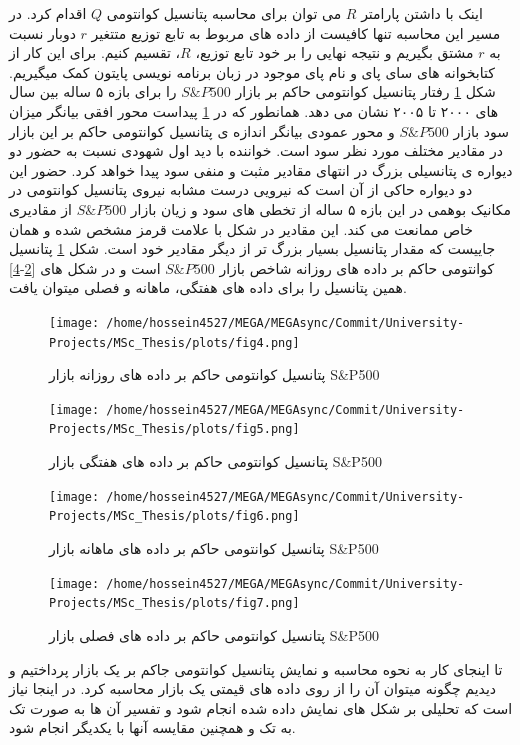 \documentclass[a4paper,titlepage,12pt,fleqn,oneside]{report}
\begin{document}
\newpage
اینک با داشتن پارامتر $R$ می توان برای محاسبه پتانسیل کوانتومی $Q$ اقدام کرد.  در مسیر این محاسبه تنها کافیست از داده های مربوط به تابع توزیع متتغیر $r$ دوبار نسبت به $r$ مشتق بگیریم و نتیجه نهایی را بر خود تابع توزیع، $R$، تقسیم کنیم. برای این کار از کتابخوانه های سای پای و نام پای موجود در زبان برنامه نویسی پایتون کمک میگیریم. شکل
\ref{fig:4}
رفتار پتانسیل کوانتومی حاکم بر بازار 
$S\&P500$
را برای بازه ۵ ساله بین سال های ۲۰۰۰ تا ۲۰۰۵ نشان می دهد. همانطور که در 
\ref{fig:4}
پیداست محور افقی بیانگر میزان سود بازار
$S\&P500$
و محور عمودی بیانگر اندازه ی پتانسیل کوانتومی حاکم بر این بازار در مقادیر مختلف مورد نظر سود است. خواننده با دید اول شهودی نسبت به حضور دو دیواره ی پتانسیلی بزرگ در انتهای مقادیر مثبت و منفی سود پیدا خواهد کرد. حضور این دو دیواره حاکی از آن است که نیرویی درست مشابه نیروی پتانسیل کوانتومی در مکانیک بوهمی در این بازه ۵ ساله از تخطی های سود و زیان بازار 
$S\&P500$
از مقادیری خاص ممانعت می کند. این مقادیر در شکل با علامت قرمز مشخص شده و همان جاییست که مقدار پتانسیل بسیار بزرگ تر از دیگر مقادیر خود است. شکل 
\ref{fig:4}
پتانسیل کوانتومی حاکم بر داده های روزانه شاخص بازار 
$S\&P500$
است و در شکل های 
[\ref{fig:5}-\ref{fig:7}]
همین پتانسیل را برای داده های هفتگی، ماهانه و فصلی میتوان یافت.

\begin{figure}[ptb]
	\centering
	\texttt{[image: /home/hossein4527/MEGA/MEGAsync/Commit/University-Projects/MSc\_Thesis/plots/fig4.png]}
	\caption{پتانسیل کوانتومی حاکم بر داده های روزانه بازار S\&P500}
	\label{fig:4}
\end{figure}

\begin{figure}[ptb]
	\centering
	\texttt{[image: /home/hossein4527/MEGA/MEGAsync/Commit/University-Projects/MSc\_Thesis/plots/fig5.png]}
	\caption{پتانسیل کوانتومی حاکم بر داده های هفتگی بازار S\&P500}
	\label{fig:5}
\end{figure}

\begin{figure}[ptb]
	\centering
	\texttt{[image: /home/hossein4527/MEGA/MEGAsync/Commit/University-Projects/MSc\_Thesis/plots/fig6.png]}
	\caption{پتانسیل کوانتومی حاکم بر داده های ماهانه بازار S\&P500}
	\label{fig:6}
\end{figure}

\begin{figure}[ptb]
	\centering
	\texttt{[image: /home/hossein4527/MEGA/MEGAsync/Commit/University-Projects/MSc\_Thesis/plots/fig7.png]}
	\caption{پتانسیل کوانتومی حاکم بر داده های فصلی بازار S\&P500}
	\label{fig:7}
\end{figure}
\newpage
تا اینجای کار به نحوه محاسبه و نمایش پتانسیل کوانتومی جاکم بر یک بازار پرداختیم و دیدیم چگونه میتوان آن را از روی داده های قیمتی یک بازار محاسبه کرد. در اینجا نیاز است که تحلیلی بر شکل های نمایش داده شده انجام شود و تفسیر آن ها به صورت تک به تک و همچنین مقایسه آنها با یکدیگر انجام شود. 
\end{document}
